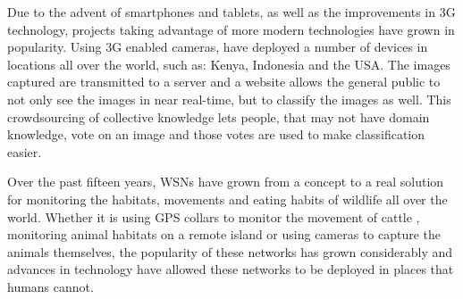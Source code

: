 	Due to the advent of smartphones and tablets, as well as the improvements in 3G technology, projects taking advantage of more modern technologies have grown in popularity. Using 3G enabled cameras, \cite{ZSL} have deployed a number of devices in locations all over the world, such as: Kenya, Indonesia and the USA. The images captured are transmitted to a server and a website allows the general public to not only see the images in near real-time, but to classify the images as well. This crowdsourcing of collective knowledge lets people, that may not have domain knowledge, vote on an image and those votes are used to make classification easier.

	Over the past fifteen years, WSNs have grown from a concept to a real solution for monitoring the habitats, movements and eating habits of wildlife all over the world. Whether it is using GPS collars to monitor the movement of cattle \cite{Juang2002}, monitoring animal habitats on a remote island or using cameras to capture the animals themselves, the popularity of these networks has grown considerably and advances in technology have allowed these networks to be deployed in places that humans cannot.





